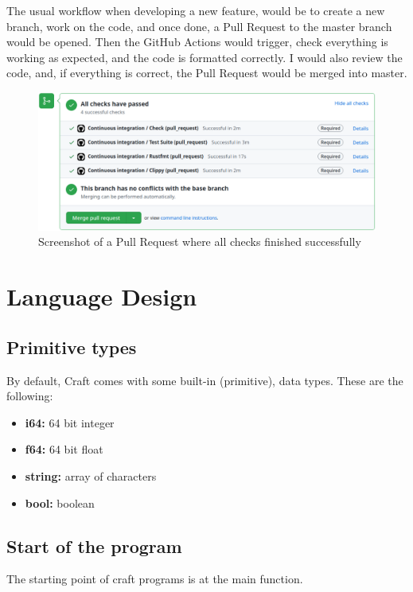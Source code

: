 ﻿\documentclass[10pt,a4paper,twocolumn,twoside]{article}
\begin{document}
The usual workflow when developing a new feature, would be to create a new
branch, work on the code, and once done, a Pull Request to the master branch
would be opened. Then the GitHub Actions would trigger, check everything is 
working as expected, and the code is formatted correctly. I would also review 
the code, and, if everything is correct, the Pull Request would be merged into
master.

\begin{figure}[ht]
\centering
\captionsetup{justification=centering,margin=1cm}
\includegraphics[width=\linewidth]{ci-pr-success}
\caption{Screenshot of a Pull Request where all checks finished successfully}
\end{figure}

\section{Language Design}

\subsection{Primitive types}
By default, Craft comes with some built-in (primitive), data types. These are
the following:

\begin{itemize}
    \item \textbf{i64:} 64 bit integer
    \item \textbf{f64:} 64 bit float
    \item \textbf{string:} array of characters
    \item \textbf{bool:} boolean
\end{itemize}

\subsection{Start of the program}
The starting point of craft programs is at the main function.
\end{document}

